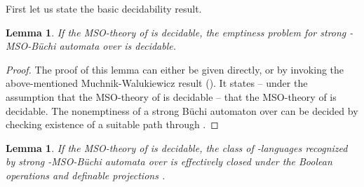 \documentclass[copyright,creativecommons]{eptcs}
\newtheorem{lemma}[theorem]{Lemma}
\theoremstyle{plain}
\theoremstyle{nonumberplain}
\newtheorem{proof}{Proof}
\begin{document}
First let us state the basic decidability result.

\begin{lemma}
If the MSO-theory of  is decidable, 
the emptiness problem for strong  -MSO-B\"uchi automata over  
is decidable. 
\end{lemma}

\begin{proof}
The proof of this lemma can either be given directly, or by invoking the 
above-mentioned Muchnik-Walukiewicz result (\cite{sem84,wal02}). 
It states -- under the assumption that 
the MSO-theory of  is decidable -- that the MSO-theory of  is 
decidable. The nonemptiness of a strong B\"uchi automaton over  can be 
decided by checking existence of a suitable path through . 
\end{proof}

\begin{lemma}
If the MSO-theory of  is decidable, the 
class of -languages recognized by strong -MSO-B\"uchi automata 
over  is effectively closed under the Boolean operations and 
definable projections .
\end{lemma}
\end{document}
